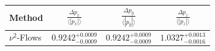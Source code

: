     \begin{tabular}{lccc}
        \toprule
        Method & $\frac{\Delta p_x}{\langle |p_x|\rangle}$ & $\frac{\Delta p_y}{\langle |p_y|\rangle}$ & $\frac{\Delta p_z}{\langle |p_z|\rangle}$ \\
        \midrule
        $\nu^2$-Flows & $0.9242^{+0.0009}_{-0.0009}$ & $0.9242^{+0.0009}_{-0.0009}$ & $1.0327^{+0.0013}_{-0.0016}$ \\
        \bottomrule
    \end{tabular}
